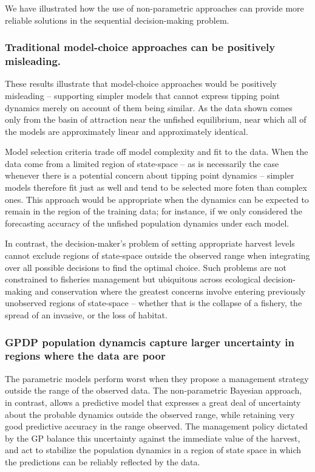 \documentclass[]{components/elsarticle}
\begin{document}
We have illustrated how the use of non-parametric approaches can provide
more reliable solutions in the sequential decision-making problem.

\subsubsection{Traditional model-choice approaches can be positively
misleading.}\label{traditional-model-choice-approaches-can-be-positively-misleading.}

These results illustrate that model-choice approaches would be
positively misleading -- supporting simpler models that cannot express
tipping point dynamics merely on account of them being similar. As the
data shown comes only from the basin of attraction near the unfished
equilibrium, near which all of the models are approximately linear and
approximately identical.

Model selection criteria trade off model complexity and fit to the data.
When the data come from a limited region of state-space -- as is
necessarily the case whenever there is a potential concern about tipping
point dynamics -- simpler models therefore fit just as well and tend to
be selected more foten than complex ones. This approach would be
appropriate when the dynamics can be expected to remain in the region of
the training data; for instance, if we only considered the forecasting
accuracy of the unfished population dynamics under each model.

In contrast, the decision-maker's problem of setting appropriate harvest
levels cannot exclude regions of state-space outside the observed range
when integrating over all possible decisions to find the optimal choice.
Such problems are not constrained to fisheries management but ubiquitous
across ecological decision-making and conservation where the greatest
concerns involve entering previously unobserved regions of state-space
-- whether that is the collapse of a fishery, the spread of an invasive,
or the loss of habitat.

\subsubsection{GPDP population dynamcis capture larger uncertainty in
regions where the data are
poor}\label{gpdp-population-dynamcis-capture-larger-uncertainty-in-regions-where-the-data-are-poor}

The parametric models perform worst when they propose a management
strategy outside the range of the observed data. The non-parametric
Bayesian approach, in contrast, allows a predictive model that expresses
a great deal of uncertainty about the probable dynamics outside the
observed range, while retaining very good predictive accuracy in the
range observed. The management policy dictated by the GP balance this
uncertainty against the immediate value of the harvest, and act to
stabilize the population dynamics in a region of state space in which
the predictions can be reliably reflected by the data.
\end{document}
